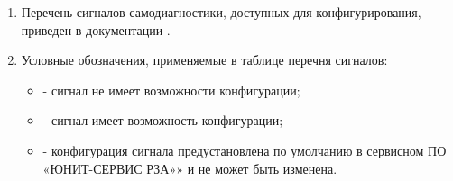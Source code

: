\areaset{267mm}{180mm}
\fancyheadoffset{0pt} %


\begin{landscape}

\setlength{\footskip}{15.5pt}

\color{black}

\begin{enumerate}[label=\ref{app:signals}.\arabic*] %
  \item Перечень сигналов самодиагностики, доступных для конфигурирования, приведен в документации \ManualUnitGeneral.
  \item Условные обозначения, применяемые в таблице перечня сигналов:
  \begin{itemize}
    \item[$\text{(--)}$] { - сигнал не имеет возможности конфигурации;}
    \item[$\text{(+)}$] { - сигнал имеет возможность конфигурации;}
    \item[$\text{(*)}$] { - конфигурация сигнала предустановлена по умолчанию в сервисном ПО «ЮНИТ-СЕРВИС РЗА»» и не может быть изменена.}
  \end{itemize}
\end{enumerate}

\small %
\begin{longtable}{
>{\centering\arraybackslash}m{6.0cm}
|>{\centering\arraybackslash}m{3.45cm}
|>{\centering\arraybackslash}m{2cm}
|>{\centering\arraybackslash}m{2cm}
|>{\centering\arraybackslash}m{2cm}
|>{\centering\arraybackslash}m{2cm}
|>{\centering\arraybackslash}m{2cm}
|>{\centering\arraybackslash}m{2cm}
|>{\centering\arraybackslash}m{2.107cm}
}


\end{longtable}
\end{landscape}
